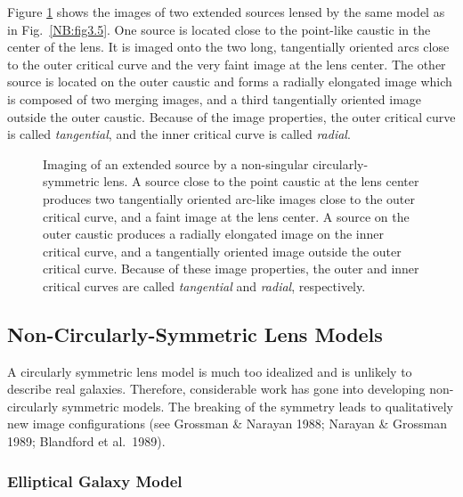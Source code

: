 \documentclass[a4paper,10pt]{article} %
\begin{document}
Figure \ref{NB:fig3.6} shows the images of two extended sources lensed
by the same model as in Fig.\ \ref{NB:fig3.5}. One source is located
close to the point-like caustic in the center of the lens. It is
imaged onto the two long, tangentially oriented arcs close to the
outer critical curve and the very faint image at the lens center. The
other source is located on the outer caustic and forms a radially
elongated image which is composed of two merging images, and a third
tangentially oriented image outside the outer caustic. Because of the
image properties, the outer critical curve is called {\em
tangential\/}, and the inner critical curve is called {\em radial\/}.

\begin{figure}[ht] %
\begin{center}
\begin{minipage}[t]{0.6\hsize}
\end{minipage}
\end{center}
\caption{Imaging of an extended source by a non-singular
  circularly-symmetric lens. A source close to the point caustic at
  the lens center produces two tangentially oriented arc-like images
  close to the outer critical curve, and a faint image at the lens
  center. A source on the outer caustic produces a radially elongated
  image on the inner critical curve, and a tangentially oriented image
  outside the outer critical curve. Because of these image properties,
  the outer and inner critical curves are called {\em tangential\/}
  and {\em radial\/}, respectively.}
\label{NB:fig3.6}
\end{figure}

\subsection{Non-Circularly-Symmetric Lens Models}
\label{NB:subsect3.5}

A circularly symmetric lens model is much too idealized and is
unlikely to describe real galaxies. Therefore, considerable work has
gone into developing non-circularly symmetric models. The breaking of
the symmetry leads to qualitatively new image configurations (see
Grossman \& Narayan 1988; Narayan \& Grossman 1989; Blandford et al.\
1989).

\subsubsection{Elliptical Galaxy Model}
\label{NB:subsubsect3.5.1}
\end{document}
